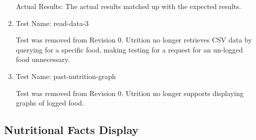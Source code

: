 \documentclass[12pt, titlepage]{article}
\begin{document}
\begin{enumerate}
		Actual Results: The actual results matched up with the expected results.

        \item{Test Name: read-data-3}
		
		Test was removed from Revision 0. Utrition no longer retrieves CSV data by querying for a specific food, making testing for a request for an un-logged food unnecessary.

        \item{Test Name: past-nutrition-graph}
		
		Test was removed from Revision 0. Utrition no longer supports displaying graphs of logged food.
		
	\end{enumerate}

	\subsection{Nutritional Facts Display}
\end{document}
